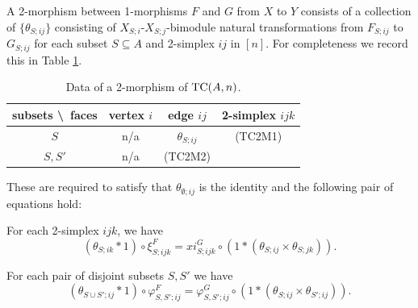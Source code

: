 \documentclass{amsart}
\begin{document}
\begin{list}{(TC1M)}{}
\begin{figure}[ht]
\begin{center}
		\end{center}
		\label{fig:EqnSSSijMorphism}
	\end{figure}
\end{list}
A 2-morphism between 1-morphisms $F$ and $G$ from $X$ to $Y$ consists of a collection of $\{ \theta_{S;ij} \}$ consisting of $X_{S;i}$-$X_{S;j}$-bimodule natural transformations from $F_{S;ij}$ to $G_{S;ij}$ for each subset $S \subseteq A$ and 2-simplex $ij$ in $[n]$. For completeness we record this in Table \ref{Table:2MorOfTC}.
\begin{table}[h]
	\caption{Data of a 2-morphism of $\mathrm{TC}(A,n)$.}
	\begin{tabular}{c |ccc}
	 subsets \textbackslash\ faces & vertex $i$ & edge $ij$ & 2-simplex $ijk$   \\
	\hline
	$S$ 				& n/a & $\theta_{S; ij}$ &     (TC2M1) \\
	$S, S'$ 			& n/a &  (TC2M2)  &    \\
	\end{tabular}
%	
%	
	\label{Table:2MorOfTC}
\end{table}
These are required to satisfy that $\theta_{\emptyset;ij}$ is the identity and the following pair of equations hold:
\begin{list}{(TC2M)}{}
	\item For each 2-simplex $ijk$, we have
	\begin{equation*}
		(\theta_{S; ik} * 1) \circ \xi^F_{S; ijk} = xi^G_{S;ijk} \circ (1 * (\theta_{S; ij} \times \theta_{S; jk})).
	\end{equation*}
	\item For each pair of disjoint subsets $S, S'$ we have
	\begin{equation*}
		(\theta_{S \cup S'; ij} * 1) \circ \varphi^F_{S, S'; ij} = \varphi^G_{S,S';ij} \circ (1*(\theta_{S;ij} \times \theta_{S';ij})).
	\end{equation*}
\end{list}
\end{document}
